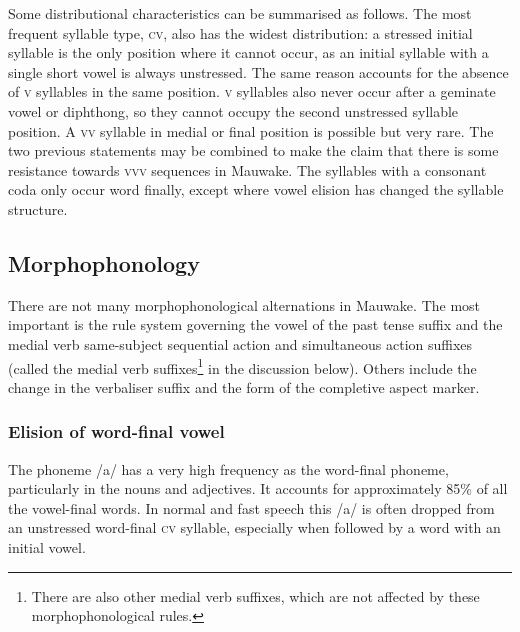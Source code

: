 





Some distributional characteristics can be summarised as follows.  The most frequent syllable type, \textsc{cv}, also has the widest distribution: a stressed initial syllable is the only position where it cannot occur, as an initial syllable with a single short vowel is always unstressed. The same reason accounts for the absence of \textsc{v} syllables in the same position. \textsc{v} syllables also never occur after a geminate vowel or diphthong, so they cannot occupy the second unstressed syllable position. A \textsc{vv} syllable in medial or final position is possible but very rare. The two previous statements may be combined to make the claim that there is some resistance towards \textsc{vvv} sequences in Mauwake. The syllables with a consonant coda only occur word finally, except where vowel elision has changed the syllable structure.  

\subsection{Morphophonology}\label{sec:2:y:x}

There are not many morphophonological alternations in Mauwake.  The most important is the rule system governing the vowel of the past tense suffix and the medial verb same-subject sequential action and simultaneous action suffixes (called the medial verb suffixes\footnote{There are also other medial verb suffixes, which are not  affected by these morphophonological rules.} in the discussion below).  Others include the change in the verbaliser suffix and the form of the completive aspect marker.

\subsubsection{Elision of word-final vowel}\label{sec:2:z:y:x}

The phoneme /a/ has a very high frequency as the word-final phoneme, particularly in the nouns and adjectives.  It accounts for approximately 85\% of all the vowel-final words.  In normal and fast speech this /a/ is often dropped from an unstressed word-final \textsc{cv} syllable, especially when followed by a word with an initial vowel. 

